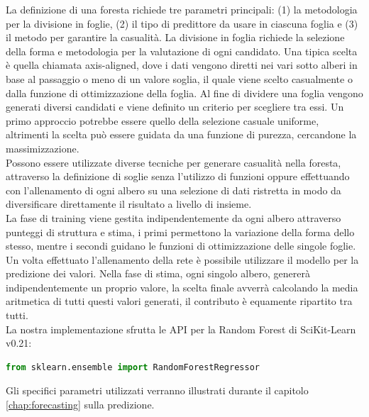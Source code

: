 \documentclass[%
    corpo=12pt,
    twoside,
    oldstyle,
    autoretitolo,
    greek,
    evenboxes,
]{toptesi}
\begin{document}
La definizione di una foresta richiede tre parametri principali: (1) la metodologia per la divisione in foglie, (2) il tipo di predittore da usare in ciascuna foglia e (3) il metodo per garantire la casualità.
La divisione in foglia richiede la selezione della forma e metodologia per la valutazione di ogni candidato. Una tipica scelta è quella chiamata axis-aligned, dove i dati vengono diretti nei vari sotto alberi in base al passaggio o meno di un valore soglia, il quale viene scelto casualmente o dalla funzione di ottimizzazione della foglia. Al fine di dividere una foglia vengono generati diversi candidati e viene definito un criterio per scegliere tra essi. Un primo approccio potrebbe essere quello della selezione casuale uniforme, altrimenti la scelta può essere guidata da una funzione di purezza, cercandone la massimizzazione.\\
Possono essere utilizzate diverse tecniche per generare casualità nella foresta, attraverso la definizione di soglie senza l'utilizzo di funzioni oppure effettuando con l'allenamento di ogni albero su una selezione di dati ristretta in modo da diversificare direttamente il risultato a livello di insieme.\\
La fase di training viene gestita indipendentemente da ogni albero attraverso punteggi di struttura e stima, i primi permettono la variazione della forma dello stesso, mentre i secondi guidano le funzioni di ottimizzazione delle singole foglie.\\
Un volta effettuato l'allenamento della rete è possibile utilizzare il modello per la predizione dei valori. Nella fase di stima, ogni singolo albero, genererà indipendentemente un proprio valore, la scelta finale avverrà calcolando la media aritmetica di tutti questi valori generati, il contributo è equamente ripartito tra tutti.\\
La nostra implementazione sfrutta le API per la Random Forest di SciKit-Learn v0.21:
\begin{lstlisting}[language=python, frame=single]
  from sklearn.ensemble import RandomForestRegressor
\end{lstlisting}
Gli specifici parametri utilizzati verranno illustrati durante il capitolo \ref{chap:forecasting} sulla predizione.
\end{document}
